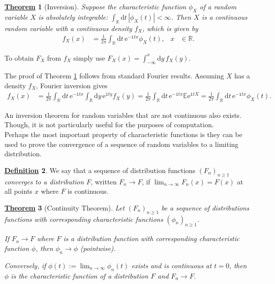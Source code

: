 \documentclass[12pt]{book}
\numberwithin{equation}{chapter}
\theoremstyle{plain}
\newtheorem{theorem}{\underline{Theorem}}
\numberwithin{theorem}{section}
\theoremstyle{definition}
\newtheorem{definition}[theorem]{\underline{Definition}}
\numberwithin{exercise}{chapter}
\let\oldendproof\endproof
\renewenvironment{proof}[1][\proofname]{%
  \oldproof[\scshape\underline{#1}]%
}{\oldendproof}
\newcommand{\<}{\langle}
\renewcommand{\>}{\rangle}
\renewcommand{\(}{\left(}
\renewcommand{\)}{\right)}
\renewcommand{\[}{\left[}
\renewcommand{\]}{\right]}
\newcommand\Eb{\mathds{E}}
\newcommand\Rb{\mathds{R}}
\newcommand\ii{\mathtt{i}}
\newcommand\dd{\mathrm{d}}
\newcommand\ee{\mathrm{e}}
\begin{document}
\begin{theorem}[Inversion]
\label{thm:inversion}
Suppose the characteristic function $\phi_X$ of a random variable $X$ is absolutely integrable: $\int_\Rb \dd t \, |\phi_X(t)| < \infty$.  Then $X$ is a continuous random variable with a continuous density $f_X$, which is given by
\begin{align}
f_X(x)
	&=	\frac{1}{2\pi} \int_\Rb \dd t \, \ee^{- \ii t x } \phi_X(t) , &
x
	&\in \Rb .
\end{align}
\end{theorem}
\noindent
To obtain $F_X$ from $f_X$ simply use $F_X(x) = \int_{-\infty}^x \dd y \, f_X(y)$.
\begin{proof}[Sketch of proof]
The proof of Theorem \ref{thm:inversion} follows from standard Fourier results.  Assuming $X$ has a density $f_X$, Fourier inversion gives
\begin{align}
f_X(x)
	&=	\frac{1}{2\pi} \int_\Rb \dd t \, \ee^{- \ii t x } \int_\Rb \dd y \, \ee^{\ii t y} f_X(y) 
	=	\frac{1}{2\pi} \int_\Rb \dd t \, \ee^{- \ii t x } \Eb \ee^{\ii t X}
	=		\frac{1}{2\pi} \int_\Rb \dd t \, \ee^{- \ii t x } \phi_X(t) .
\end{align}
\end{proof}

\noindent
An inversion theorem for random variables that are not continuous also exists.  Though, it is not particularly useful for the purposes of computation.
\\[0.5em]
Perhaps the most important property of characteristic functions is they can be used to prove the convergence of a sequence of random variables to a limiting distribution.

\begin{definition}
\label{def:Fn.convergence}
We say that a sequence of distribution functions $(F_n)_{n \geq 1}$ \emph{converges to a distribution $F$}, written $F_n \to F$, if $\lim_{n \to \infty} F_n(x) = F(x)$ at all points $x$ where $F$ is continuous.    
\end{definition}

\begin{theorem}[Continuity Theorem]
\label{thm:continuity}
Let $(F_n)_{n \geq 1}$ be a sequence of distributions functions with corresponding characteristic functions $(\phi_n)_{n \geq 1}$.  
\begin{enumerate*}
\item If $F_n \to F$ where $F$ is a distribution function with corresponding characteristic function $\phi$, then $\phi_n \to \phi$ (pointwise).
\item Conversely, if $\phi(t):=\lim_{n \to \infty} \phi_n(t)$ exists and is continuous at $t=0$, then $\phi$ is the characteristic function of a distribution $F$ and $F_n \to F$. \label{itm:phi.to.F}
\end{enumerate*}
\end{theorem}
\end{document}
